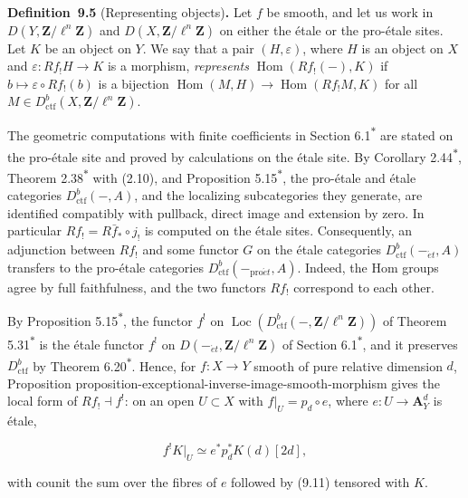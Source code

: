 \documentclass[11pt]{article}
\newenvironment{bpstatement}[2]{\par\addvspace{0.6\baselineskip}\noindent\textbf{#1}#2\textbf{.}\enspace\ignorespaces}
  {\par\addvspace{0.4\baselineskip}}
\newcommand{\bpout}[1]{#1\textsuperscript{\hyperlink{bp-outside}{\ensuremath{\ast}}}}
\providecommand{\Loc}{}\renewcommand{\Loc}{\operatorname{Loc}}
\begin{document}
\label{bp17}%
\begin{bpstatement}{Definition~9.5}{ (Representing objects)}
Let \(f\) be smooth, and let us work in \(D(Y,\mathbf Z/\ell^n\mathbf Z)\) and \(D(X,\mathbf Z/\ell^n\mathbf Z)\) on either the étale or the pro-étale sites. Let \(K\) be an object on \(Y\). We say that a pair \((H,\varepsilon)\), where \(H\) is an object on \(X\) and \(\varepsilon:Rf_!H\to K\) is a morphism, \emph{represents} \(\operatorname{Hom}(Rf_!(-),K)\) if \(b\mapsto\varepsilon\circ Rf_!(b)\) is a bijection \(\operatorname{Hom}(M,H)\to\operatorname{Hom}(Rf_!M,K)\) for all \(M\in D^b_{\mathrm{ctf}}(X,\mathbf Z/\ell^n\mathbf Z)\).
\end{bpstatement}

\label{bp18}%
The geometric computations with finite coefficients in Section \bpout{6.1} are stated on the pro-étale site and proved by calculations on the étale site. By Corollary \bpout{2.44}, Theorem \bpout{2.38} with (2.10), and Proposition \bpout{5.15}, the pro-étale and étale categories \(D^b_{\mathrm{ctf}}(-,A)\), and the localizing subcategories they generate, are identified compatibly with pullback, direct image and extension by zero. In particular \(Rf_!=R\bar f_*\circ j_!\) is computed on the étale sites. Consequently, an adjunction between \(Rf_!\) and some functor \(G\) on the étale categories \(D^b_{\mathrm{ctf}}(-_{\acute{e}t},A)\) transfers to the pro-étale categories \(D^b_{\mathrm{ctf}}(-_{\mathrm{pro}\acute{e}t},A)\). Indeed, the Hom groups agree by full faithfulness, and the two functors \(Rf_!\) correspond to each other.

By Proposition \bpout{5.15}, the functor \(f^!\) on \(\Loc(D^b_{\mathrm{ctf}}(-,\mathbf Z/\ell^n\mathbf Z))\) of Theorem \bpout{5.31} is the étale functor \(f^!\) on \(D(-_{\acute{e}t},\mathbf Z/\ell^n\mathbf Z)\) of Section \bpout{6.1}, and it preserves \(D^b_{\mathrm{ctf}}\) by Theorem \bpout{6.20}. Hence, for \(f:X\to Y\) smooth of pure relative dimension \(d\), Proposition proposition-exceptional-inverse-image-smooth-morphism gives the local form of \(Rf_!\dashv f^!\): on an open \(U\subset X\) with \(f|_U=p_d\circ e\), where \(e:U\to\mathbf A^d_Y\) is étale,

\[
f^!K|_U\simeq e^*p_{d}^*K(d)[2d],
\]

with counit the sum over the fibres of \(e\) followed by (9.11) tensored with \(K\).
\end{document}
